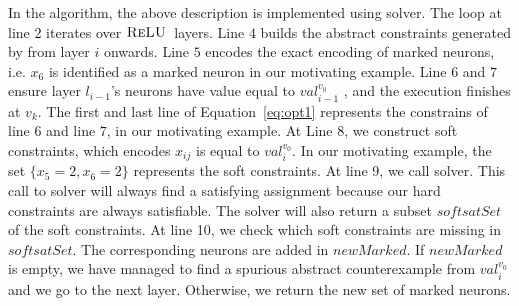 In the algorithm, the above description is implemented using \maxsat{} solver.
The loop at line 2 iterates over $\textsc{ReLU}${}~layers.
Line $4$ builds the abstract constraints generated by \deeppoly{} from layer $i$ onwards. 
Line $5$ encodes the exact encoding of marked neurons, i.e. $x_6$ is identified as a marked neuron in our motivating example. 
Line $6$ and $7$ ensure layer $l_{i-1}$'s neurons have value equal to ${val_{i-1}^{v_0}}$
, and the execution finishes at $v_k$.
The first and last line of Equation~\ref{eq:opt1} represents the constrains of line $6$ and line $7$, 
in our motivating example.
At Line 8, we construct soft constraints, which encodes $x_{ij}$ is equal to $val_{i}^{v_0}$. 
In our motivating example, the set $\{x_5 = 2, x_6 = 2\}$ represents the soft constraints.
At line 9, we call \maxsat{} solver. 
This call to \maxsat{} solver will always find a satisfying assignment because
our hard constraints are always satisfiable.
The solver will also return a subset $softsatSet$ of the soft constraints.
At line 10, we check which soft constraints are missing in $softsatSet$.
The corresponding neurons are added in $newMarked$.
If $newMarked$ is empty, we have managed to find a spurious
abstract counterexample from $val^{v_0}_{i}$ and we go to the next layer.
Otherwise, we return the new set of marked neurons.


